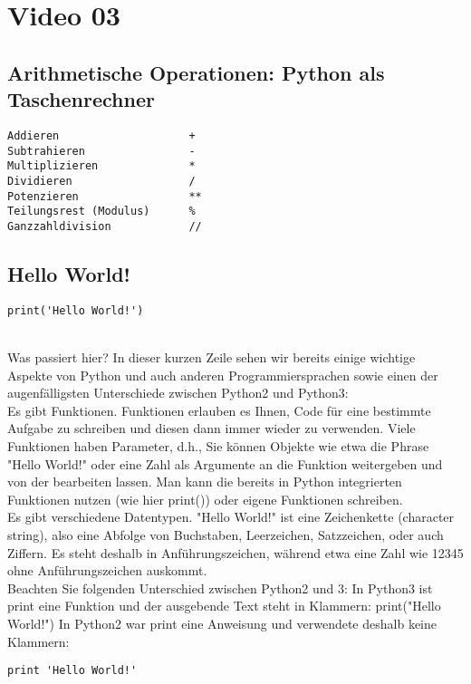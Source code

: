 \documentclass{article}
\begin{document}
\section{Video 03}
\subsection{Arithmetische Operationen: Python als Taschenrechner}
\begin{verbatim}
Addieren                    +
Subtrahieren                -
Multiplizieren              *
Dividieren                  /
Potenzieren                 **
Teilungsrest (Modulus)      %
Ganzzahldivision            //
\end{verbatim}

\subsection{Hello World!}
\begin{verbatim}
print('Hello World!')
\end{verbatim}
\\
Was passiert hier?
In dieser kurzen Zeile sehen wir bereits einige wichtige Aspekte von Python und auch anderen Programmiersprachen sowie einen der augenfälligsten Unterschiede zwischen Python2 und Python3:\\
Es gibt Funktionen. Funktionen erlauben es Ihnen, Code für eine bestimmte Aufgabe zu schreiben und diesen dann immer wieder zu verwenden. Viele Funktionen haben Parameter, d.h., Sie können Objekte wie etwa die Phrase "Hello World!" oder eine Zahl als Argumente an die Funktion weitergeben und von der bearbeiten lassen. Man kann die bereits in Python integrierten Funktionen nutzen (wie hier print()) oder eigene Funktionen schreiben.\\
\newpage
Es gibt verschiedene Datentypen. "Hello World!" ist eine Zeichenkette (character string), also eine Abfolge von Buchstaben, Leerzeichen, Satzzeichen, oder auch Ziffern. Es steht deshalb in Anführungszeichen, während etwa eine Zahl wie 12345 ohne Anführungszeichen auskommt.\\
Beachten Sie folgenden Unterschied zwischen Python2 und 3: In Python3 ist print eine Funktion und der ausgebende Text steht in Klammern: print("Hello World!") In Python2 war print eine Anweisung und verwendete deshalb keine Klammern:\\
\begin{verbatim}
print 'Hello World!'
\end{verbatim}
\end{document}
